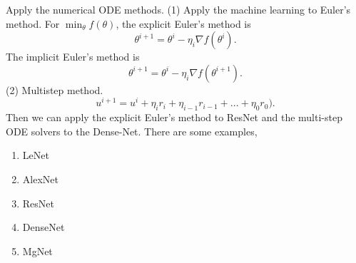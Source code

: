 Apply the numerical ODE methods.
(1) Apply the machine learning to Euler's method.
For $\min_{\theta} f(\theta)$, the explicit Euler's method is
\begin{equation} \theta^{i+1}=\theta^i-\eta_i\nabla f(\theta^i). \end{equation}
The implicit Euler's method is
\begin{equation} \theta^{i+1}=\theta^i-\eta_i\nabla f(\theta^{i+1}). \end{equation}
(2) Multistep method.
\begin{equation} u^{i+1}=u^i+\eta_i r_i+\eta_{i-1} r_{i-1}+...+\eta_0 r_0). \end{equation}
Then we can apply the explicit Euler's method to ResNet and the multi-step ODE solvers to the Dense-Net.
There are some examples,
\begin{enumerate}
\item LeNet
\item AlexNet
\item ResNet
\item DenseNet
\item MgNet
\end{enumerate}

